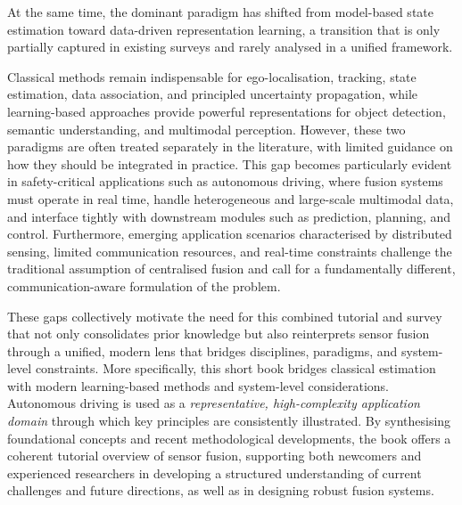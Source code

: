 At the same time, the dominant paradigm has shifted from model-based state estimation toward data-driven representation learning, a transition that is only partially captured in existing surveys and rarely analysed in a unified framework.

%
Classical methods remain indispensable for ego-localisation, tracking, state estimation, data association, and principled uncertainty propagation, while learning-based approaches provide powerful representations for object detection, semantic understanding, and multimodal perception. However, these two paradigms are often treated separately in the literature, with limited guidance on how they should be integrated in practice. This gap becomes particularly evident in safety-critical applications such as autonomous driving, where fusion systems must operate in real time, handle heterogeneous and large-scale multimodal data, and interface tightly with downstream modules such as prediction, planning, and control.
%
Furthermore, emerging application scenarios characterised by distributed sensing, limited communication resources, and real-time constraints challenge the traditional assumption of centralised fusion and call for a fundamentally different, communication-aware formulation of the problem.



These gaps collectively motivate the need for this combined tutorial and survey that not only consolidates prior knowledge but also reinterprets sensor fusion through a unified, modern lens that bridges disciplines, paradigms, and system-level constraints. More specifically, this short book bridges classical estimation with modern learning-based methods and system-level considerations. Autonomous driving is used as a \emph{representative, high-complexity application domain} through which key principles are consistently illustrated. By synthesising foundational concepts and recent methodological developments, the book offers a coherent tutorial overview of sensor fusion, supporting both newcomers and experienced researchers in developing a structured understanding of current challenges and future directions, as well as in designing robust fusion systems.

